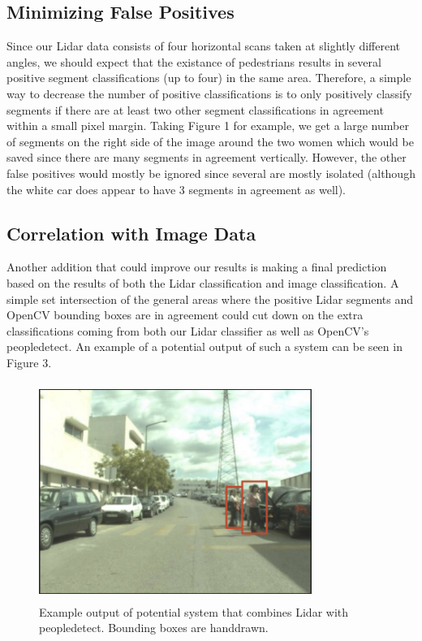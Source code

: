 \documentclass[10pt,twocolumn,letterpaper]{article}
\begin{document}
  \subsection{Minimizing False Positives}
  Since our Lidar data consists of four horizontal scans taken at slightly different angles,
  we should expect that the existance of pedestrians results in several positive segment
  classifications (up to four) in the same area. Therefore, a simple way to decrease
  the number of positive classifications is to only positively classify segments if there
  are at least two other segment classifications in agreement within a small pixel margin.
  Taking Figure 1 for example, we get a large number of segments on the right side
  of the image around the two women which would be saved since there are many segments in
  agreement vertically. However, the other false positives would mostly be ignored
  since several are mostly isolated (although the white car does appear to have 3 segments
  in agreement as well).

  \subsection{Correlation with Image Data}
  Another addition that could improve our results is making a final prediction based
  on the results of both the Lidar classification and image classification. A simple
  set intersection of the general areas where the positive Lidar segments and OpenCV
  bounding boxes are in agreement could cut down on the extra classifications coming from
  both our Lidar classifier as well as OpenCV's peopledetect. An example of a potential
  output of such a system can be seen in Figure 3.

  \begin{figure}
    \includegraphics[height=2.8in, width=3.5in]{images/futureWork.png}
    \caption{ Example output of potential system that combines Lidar with peopledetect.
    Bounding boxes are handdrawn. }
  \end{figure}
\end{document}
